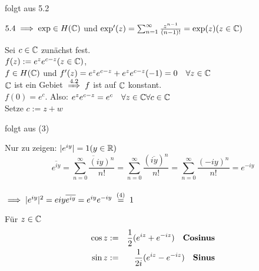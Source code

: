 \documentclass[a4paper,twoside,DIV15,BCOR12mm]{scrbook}
\begin{document}
\begin{beweis}
\begin{liste}
\item folgt aus 5.2
\item $5.4 \implies \exp \in H(\mathbb{C} )$ und $\exp '(z) = \sum_{n=1}^{\infty}\frac{z^{n-1}}{(n-1)!} = \exp (z) (z \in \mathbb{C} )$
\item Sei $c \in \mathbb{C}$ zunächst fest. \\
$f(z) := e^ze^{c-z} (z \in \mathbb{C} )$, \\
$f\in H(\mathbb{C} )$ und $f'(z) = e^ze^{c-z} + e^ze^{c-z}(-1) = 0 \quad \forall z \in \mathbb{C}$ \\
$\mathbb{C}$ ist ein Gebiet $\folgtnach{4.2} f$ ist auf $\mathbb{C}$ konstant. \\
$f(0) = e^c$. Also: $e^ze^{c-z} = e^c \quad \forall z\in \mathbb{C} \forall c\in \mathbb{C}$ \\
Setze $c := z + w$
\item folgt aus (3)
\item Nur zu zeigen: $|e^{iy}| = 1 (y \in \mathbb{R})$ \\
$$ \overline{e^{iy}} = \overline{\sum_{n=0}^{\infty}\frac{(iy)^n}{n!}} = \sum_{n=0}^{\infty}\frac{(\overline{{iy}})^n}{n!} = \sum_{n=0}^{\infty}\frac{(-iy)^n}{n!} = e^{-iy}$$ \\
$\folgt |e^{iy}|^2 = e{iy}\overline{e^{iy}} = e^{iy}e^{-iy} \gleichnach{(4)} 1$ 
\end{liste}
\end{beweis}

\begin{definition}
Für $z \in \mathbb{C}$ 
\begin{eqnarray}\notag \cos z &:=& \frac{1}{2}(e^{iz} + e^{-iz}) \quad \begriff{Cosinus}\\
\notag\sin z &:=& \frac{1}{2i}(e^{iz} - e^{-iz}) \quad \begriff{Sinus} \end{eqnarray}
\end{definition}
\end{document}
